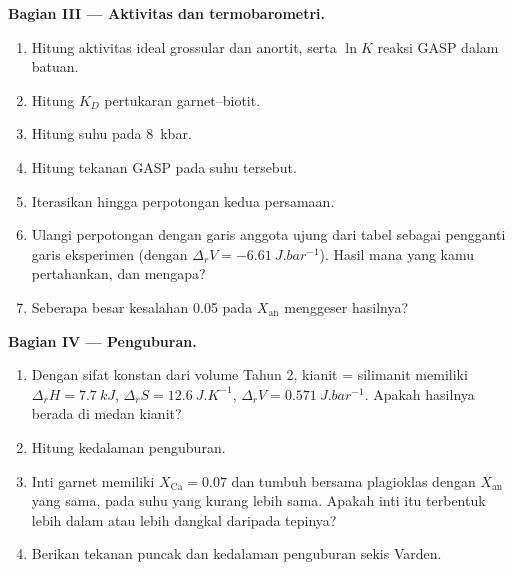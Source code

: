 \begin{problem}
\medskip\noindent\textbf{Bagian III --- Aktivitas dan termobarometri.}
\begin{enumerate}[resume]
  \item Hitung aktivitas ideal grossular dan anortit, serta $\ln K$
        reaksi GASP dalam batuan.
  \item Hitung $K_D$ pertukaran garnet--biotit.
  \item Hitung suhu pada \qty{8}{kbar}.
  \item Hitung tekanan GASP pada suhu tersebut.
  \item Iterasikan hingga perpotongan kedua persamaan.
  \item Ulangi perpotongan dengan garis anggota ujung dari tabel sebagai pengganti
        garis eksperimen (dengan $\Delta_rV = \qty{-6.61}{J.bar^{-1}}$).
        Hasil mana yang kamu pertahankan, dan mengapa?
  \item Seberapa besar kesalahan 0.05 pada $X_{\text{an}}$ menggeser
        hasilnya?
\end{enumerate}

\medskip\noindent\textbf{Bagian IV --- Penguburan.}
\begin{enumerate}[resume]
  \item Dengan sifat konstan dari volume Tahun 2, kianit =
        silimanit memiliki $\Delta_rH = \qty{7.7}{kJ}$, $\Delta_rS =
        \qty{12.6}{J.K^{-1}}$, $\Delta_rV = \qty{0.571}{J.bar^{-1}}$. Apakah
        hasilnya berada di medan kianit?
  \item Hitung kedalaman penguburan.
  \item Inti garnet memiliki $X_{\text{Ca}} = 0.07$ dan tumbuh bersama plagioklas
        dengan $X_{\text{an}}$ yang sama, pada suhu yang kurang lebih sama. Apakah
        inti itu terbentuk lebih dalam atau lebih dangkal daripada tepinya?
  \item Berikan tekanan puncak dan kedalaman penguburan sekis Varden.
\end{enumerate}
\end{problem}
